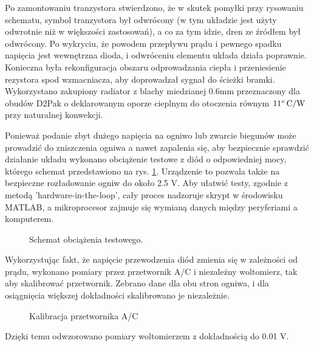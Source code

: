 \documentclass[polish,engineer]{polsl-msth}
\begin{document}
Po zamontowaniu tranzystora stwierdzono, że w skutek pomyłki przy rysowaniu schematu, symbol tranzystora był odwrócony (w tym układzie jest użyty odwrotnie niż w większości zastosowań), a co za tym idzie, dren ze źródłem był odwrócony. Po wykryciu, że powodem przepływu prądu i pewnego spadku napięcia jest wewnętrzna dioda, i odwróceniu elementu układa działa poprawnie. Konieczna była rekonfiguracja obszaru odprowadzania ciepła i przeniesienie rezystora spod wzmacniacza, aby doprowadzał sygnał do ścieżki bramki. Wykorzystano zakupiony radiator z blachy miedzianej 0.6mm przeznaczony dla obudów D2Pak o deklarowanym oporze cieplnym do otoczenia równym $\mathrm{11\degree \,C/W}$ przy naturalnej konwekcji. 

Ponieważ podanie zbyt dużego napięcia na ogniwo lub zwarcie biegunów może prowadzić do zniszczenia ogniwa a nawet zapalenia się, aby bezpiecznie sprawdzić działanie układu wykonano obciążenie testowe z diód o odpowiedniej mocy, którego schemat przedstawiono na rys. \ref{img:testload}. Urządzenie to pozwala także na bezpieczne rozładowanie ogniw do około 2.5 V.
Aby ułatwić testy, zgodnie z metodą 'hardware-in-the-loop', cały proces nadzoruje skrypt w środowisku MATLAB, a mikroprocesor zajmuje się wymianą danych między peryferiami a komputerem.
\begin{figure}[hbtp]
    \centering
    \caption{Schemat obciążenia testowego. \label{img:testload}}
\end{figure}

Wykorzystując fakt, że napięcie przewodzenia diód zmienia się w zależności od prądu, wykonano pomiary przez przetwornik A/C i niezależny woltomierz, tak aby skalibrować przetwornik. Zebrano dane dla obu stron ogniwa, i dla osiągnięcia większej dokładności skalibrowano je niezależnie.
\begin{figure}[hbtp]
     \caption{Kalibracja przetwornika A/C \label{img:ADCfitting}}
\end{figure}
Dzięki temu odwzorowano pomiary woltomierzem z dokładnością do 0.01 V.
\end{document}
